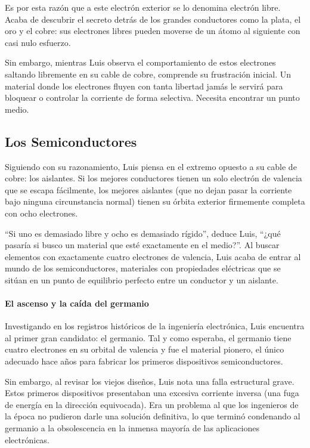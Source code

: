 Es por esta razón que a este electrón exterior se lo denomina electrón libre. Acaba de descubrir el secreto detrás de los grandes conductores como la plata, el oro y el cobre: sus electrones libres pueden moverse de un átomo al siguiente con casi nulo esfuerzo.

Sin embargo, mientras Luis observa el comportamiento de estos electrones saltando libremente en su cable de cobre, comprende su frustración inicial. Un material donde los electrones fluyen con tanta libertad jamás le servirá para bloquear o controlar la corriente de forma selectiva. Necesita encontrar un punto medio.

\subsection{Los Semiconductores}

Siguiendo con su razonamiento, Luis piensa en el extremo opuesto a su cable de cobre: los aislantes. Si los mejores conductores tienen un solo electrón de valencia que se escapa fácilmente, los mejores aislantes (que no dejan pasar la corriente bajo ninguna circunstancia normal) tienen su órbita exterior firmemente completa con ocho electrones.

``Si uno es demasiado libre y ocho es demasiado rígido'', deduce Luis, ``¿qué pasaría si busco un material que esté exactamente en el medio?''. Al buscar elementos con exactamente cuatro electrones de valencia, Luis acaba de entrar al mundo de los semiconductores, materiales con propiedades eléctricas que se sitúan en un punto de equilibrio perfecto entre un conductor y un aislante.

\paragraph{El ascenso y la caída del germanio}
Investigando en los registros históricos de la ingeniería electrónica, Luis encuentra al primer gran candidato: el germanio. Tal y como esperaba, el germanio tiene cuatro electrones en su orbital de valencia y fue el material pionero, el único adecuado hace años para fabricar los primeros dispositivos semiconductores.

Sin embargo, al revisar los viejos diseños, Luis nota una falla estructural grave. Estos primeros dispositivos presentaban una excesiva corriente inversa (una fuga de energía en la dirección equivocada). Era un problema al que los ingenieros de la época no pudieron darle una solución definitiva, lo que terminó condenando al germanio a la obsolescencia en la inmensa mayoría de las aplicaciones electrónicas.

